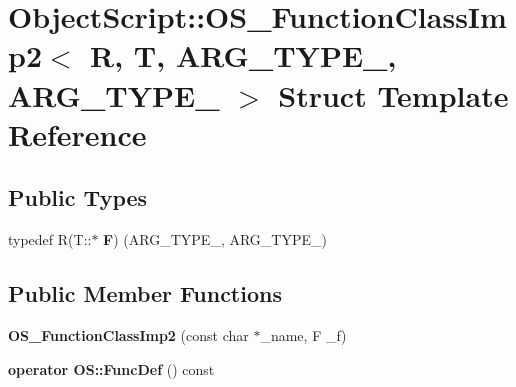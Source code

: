 \hypertarget{struct_object_script_1_1_o_s___function_class_imp2}{}\section{Object\+Script\+:\+:O\+S\+\_\+\+Function\+Class\+Imp2$<$ R, T, A\+R\+G\+\_\+\+T\+Y\+P\+E\+\_, A\+R\+G\+\_\+\+T\+Y\+P\+E\+\_ $>$ Struct Template Reference}
\label{struct_object_script_1_1_o_s___function_class_imp2}
\subsection*{Public Types}
\begin{DoxyCompactItemize}
\item 
typedef R(T\+::$\ast$ {\bfseries F}) (A\+R\+G\+\_\+\+T\+Y\+P\+E\+\_, A\+R\+G\+\_\+\+T\+Y\+P\+E\+\_)\hypertarget{struct_object_script_1_1_o_s___function_class_imp2_a0175c4705ffd85946fa7e4c728ec234d}{}\label{struct_object_script_1_1_o_s___function_class_imp2_a0175c4705ffd85946fa7e4c728ec234d}

\end{DoxyCompactItemize}
\subsection*{Public Member Functions}
\begin{DoxyCompactItemize}
\item 
{\bfseries O\+S\+\_\+\+Function\+Class\+Imp2} (const char $\ast$\+\_\+name, F \+\_\+f)\hypertarget{struct_object_script_1_1_o_s___function_class_imp2_a067d7400fb9dcf42cb5ba0d95dd2f18f}{}\label{struct_object_script_1_1_o_s___function_class_imp2_a067d7400fb9dcf42cb5ba0d95dd2f18f}

\item 
{\bfseries operator O\+S\+::\+Func\+Def} () const \hypertarget{struct_object_script_1_1_o_s___function_class_imp2_a75e5488f0d6aea55c6dfaecd267fe0a3}{}\label{struct_object_script_1_1_o_s___function_class_imp2_a75e5488f0d6aea55c6dfaecd267fe0a3}

\end{DoxyCompactItemize}
